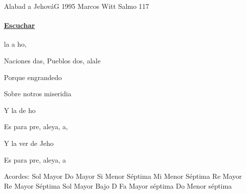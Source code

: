 \documentclass[12pt, spanish]{book}
\newcommand{\NotCCLIed}{\relax}
\begin{document}
    \begin{song}{Alabad a Jehová}{G}
        {1995} %
        {Marcos Witt}
        {Salmo 117} %
        {} %
        \ifChordBk
        \paragraph{\mbox{}\hfill\protect\href{https://open.spotify.com/intl-es/track/2Tvolgbkl1srgF6N83X7Xd}{Escuchar}\mbox{}\hfill}
        \fi




        \begin{SBOpGroup}
            la   a ho,

            Naciones das, Pueblos dos, alale

            Porque  engrandedo

            Sobre notros  miseridia
        \end{SBOpGroup}
        \vskip 20pt
        \begin{SBOpGroup}
            Y la    de ho

            Es para pre, aleya, a,

            Y la ver    de Jeho

            Es para pre, aleya, a
        \end{SBOpGroup}


        \ifChordBk
        \begin{SBOpGroup}
            Acordes:\break
            \upchord{\G}\qquad Sol Mayor \hfill
            \upchord{\C}\qquad Do Mayor \hfill\null\break
            \upchord{\Bmseven}\qquad Si Menor S\'eptima \hfill
            \upchord{\Emseven}\qquad Mi Menor S\'eptima \hfill\null\break
            \upchord{\D}\qquad Re Mayor \hfill
            \upchord{\Dseven}\qquad Re Mayor S\'eptima \hfill\null\break
            \upchord{\GD}\qquad Sol Mayor Bajo D \hfill
            \upchord{\Fseven}\qquad Fa Mayor s\'eptima \hfill\null\break
            \upchord{\Cmseven}\qquad Do Menor s\'eptima \hfill\null\break
        \end{SBOpGroup}
        \fi
    \end{song}
\end{document}

